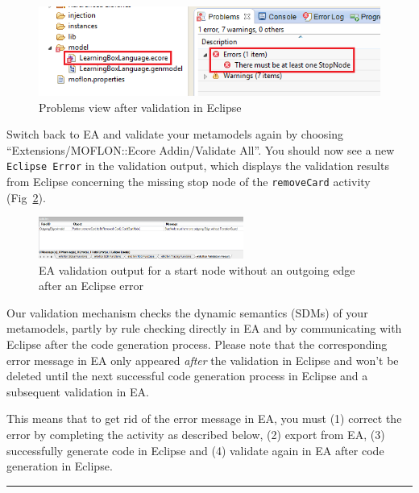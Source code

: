 \begin{figure}[htp]
\begin{center}
  \includegraphics[width=\textwidth]{pics/sdmBilder/removeCard/sdm17RAW}
  \caption{Problems view after validation in Eclipse}  
  \label{fig:eclipse_problems_view}
\end{center}
\end{figure}

Switch back to EA and validate your metamodels again by choosing ``Extensions/MOFLON::Ecore Addin/Validate All''.
You should now see a new \texttt{Eclipse Error} in the validation output, which displays the validation results from Eclipse concerning the missing stop node of the \texttt{removeCard} activity (Fig~\ref{fig:ea_eclipse_error}). 

\begin{figure}[htp]
\begin{center}
  \includegraphics[width=0.6\textwidth]{pics/sdmBilder/removeCard/sdm16RAW}
  \caption{EA validation output for a start node without an outgoing edge after an Eclipse error}  
  \label{fig:ea_eclipse_error}
\end{center}
\end{figure}


Our validation mechanism checks the dynamic semantics (SDMs) of your metamodels, partly by rule checking directly in EA and by communicating with Eclipse after the code generation process. 
Please note that the corresponding error message in EA only appeared \emph{after} the validation in Eclipse and won't be deleted until the next successful code generation process in Eclipse and a subsequent validation in EA.

This means that to get rid of the error message in EA, you must (1) correct the error by completing the activity as described below, (2) export from EA, (3) successfully generate code in Eclipse and (4) validate again in EA after code generation in Eclipse.\\
\noindent\rule[-1ex]{0.5\textwidth}{0.5pt}\\

